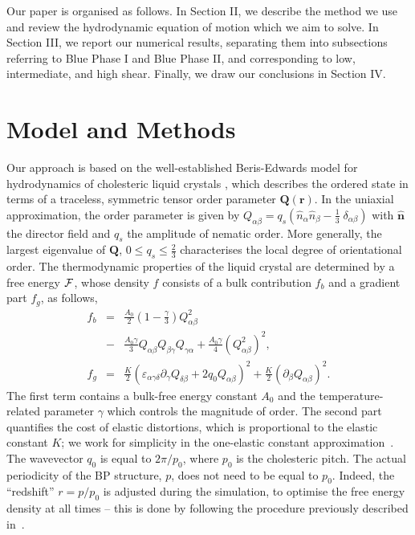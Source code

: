\documentclass[aps,pre,reprint,superscriptaddress, twocolumn]{revtex4}
\begin{document}
Our paper is organised as follows. 
In Section II, we describe the method we use and review
the hydrodynamic equation of motion which we aim to solve. In Section III, 
we report our numerical results, separating them into subsections referring to
Blue Phase I and Blue Phase II, and corresponding to low, intermediate, and
high shear. Finally, we draw our conclusions in Section IV.

\section{Model and Methods}

Our approach is based on the well-established Beris-Edwards model for hydrodynamics of
cholesteric liquid crystals \cite{Beris:1994}, which describes the ordered state 
in terms of a traceless, symmetric tensor order parameter ${\mathbf Q}({\mathbf r})$. 
In the uniaxial approximation, the order parameter is given by
$Q_{\alpha \beta}= q_s ( \hat{n}_\alpha \hat{n}_\beta - \frac{1}{3}\; \delta_{\alpha\beta})$
with $\hat{{\mathbf n}}$ the director field and $q_s$ the amplitude of nematic
order. More generally,
the largest eigenvalue of ${\mathbf Q}$, $0\le q_s\le\frac{2}{3}$
characterises the local degree of orientational order.
The thermodynamic properties of the liquid crystal are determined by a free energy
${\cal F}$, whose density $f$ consists of a bulk contribution $f_b$ and a gradient part $f_g$, as follows,
\begin{eqnarray}
f_b&=&\frac{A_0}{2}\left(1-\frac{\gamma}{3}\right) Q_{\alpha \beta}^2\nonumber\\
&-&\frac{A_0 \gamma}{3}Q_{\alpha \beta} Q_{\beta \gamma} Q_{\gamma \alpha}+\frac{A_0 \gamma}{4}(Q_{\alpha \beta}^2)^2,\nonumber\\
f_g&=&\frac{K}{2}(\varepsilon_{\alpha\gamma\delta} \partial_\gamma Q_{\delta\beta}+2 q_0 Q_{\alpha \beta})^2+\frac{K}{2}(\partial_\beta Q_{\alpha \beta})^2.\label{FE}
\end{eqnarray}
The first term contains a bulk-free energy constant $A_0$ and the temperature-related parameter $\gamma$ which controls the magnitude of order.
The second part quantifies the cost of elastic distortions, which is proportional to the elastic constant $K$;
we work for simplicity in the one-elastic constant approximation~\cite{deGennes}. The wavevector $q_0$ is equal to $2\pi/p_0$, where $p_0$ is the cholesteric pitch.
The actual periodicity of the BP structure, $p$, does not need to be equal to $p_0$.
Indeed, the ``redshift'' $r=p/p_0$ is adjusted during the simulation, to optimise the free energy density
at all times -- this is done by following the procedure
previously described in~\cite{Alexander:2006}.
\end{document}
